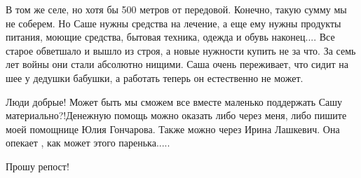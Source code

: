 В том же селе, но хотя бы 500 метров от передовой. Конечно, такую сумму мы не
соберем. Но Саше нужны средства на лечение, а еще ему нужны продукты питания,
моющие средства, бытовая техника, одежда и обувь наконец.... Все старое
обветшало и  вышло из строя, а новые нужности купить не за что. За семь лет
войны они стали абсолютно нищими. Саша очень переживает, что сидит на шее у
дедушки   бабушки, а  работать теперь он естественно не может.

Люди добрые! Может быть мы сможем все вместе маленько поддержать Сашу
материально?!Денежную помощь можно оказать либо через меня, либо пишите моей
помощнице Юлия Гончарова. Также можно через  Ирина Лашкевич. Она опекает , как
может этого паренька.....

Прошу репост!
